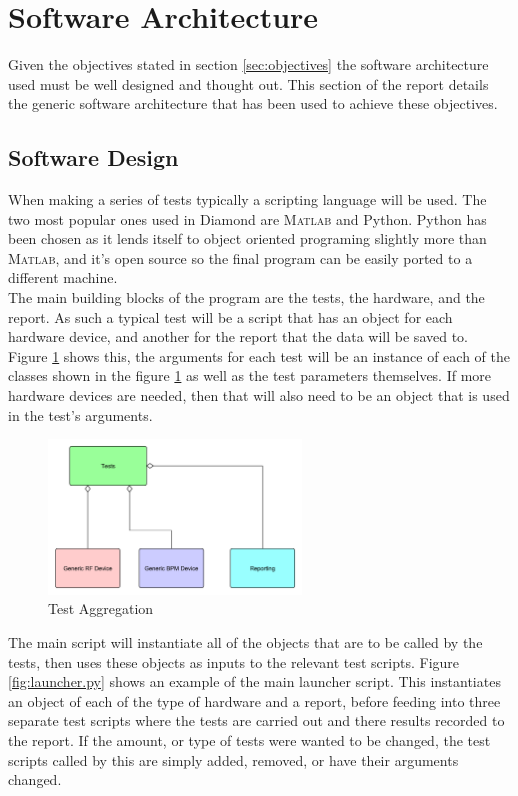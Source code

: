 \documentclass[a4paper, 11pt]{article}
\begin{document}
\section{Software Architecture}\label{sec:SoftwareArchitecture}
Given the objectives stated in section \ref{sec:objectives} the software architecture used must be well designed and thought out. This section of the report details the generic software architecture that has been used to achieve these objectives.  

\subsection{Software Design}
When making a series of tests typically a scripting language will be used. The two most popular ones used in Diamond are \textsc{Matlab} and Python. Python has been chosen as it lends itself to object oriented programing slightly more than \textsc{Matlab}, and it's open source so the final program can be easily ported to a different machine. \\

The main building blocks of the program are the tests, the hardware, and the report. As such a typical test will be a script that has an object for each hardware device, and another for the report that the data will be saved to. Figure \ref{fig:TestAggregation} shows this, the arguments for each test will be an instance of each of the classes shown in the figure \ref{fig:TestAggregation} as well as the test parameters themselves. If more hardware devices are needed, then that will also need to be an object that is used in the test's arguments. \\

\begin{figure}[H]
	\centering
	\includegraphics[width=0.6\textwidth]{TestDependency.pdf}
	\caption{Test Aggregation}
    \label{fig:TestAggregation}
\end{figure}

The main script will instantiate all of the objects that are to be called by the tests, then uses these objects as inputs to the relevant test scripts. Figure \ref{fig:launcher.py} shows an example of the main launcher script. This instantiates an object of each of the type of hardware and a report, before feeding into three separate test scripts where the tests are carried out and there results recorded to the report. If the amount, or type of tests were wanted to be changed, the test scripts called by this are simply added, removed, or have their arguments changed.  
\end{document}
